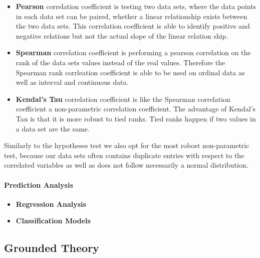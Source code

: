 \begin{itemize}
\item\textbf{Pearson} correlation coefficient is testing two data sets, where the data points in each data set can be paired, whether a linear relationship exists between the two data sets.
This correlation coefficient is able to identify positive and negative relations but not the actual slope of the linear relation ship.

\item\textbf{Spearman} correlation coefficient is performing a pearson correlation on the rank of the data sets values instead of the real values.
Therefore the Spearman rank corrleation coefficient is able to be used on ordinal data as well as interval and continuous data. 

\item\textbf{Kendal's Tau} correlation coefficient is like the Spearman correlation coefficient a non-parametric correlation coefficient.
The advantage of Kendal's Tau is that it is more robust to tied ranks.
Tied ranks happen if two values in a data set are the same.
\end{itemize}

Similarly to the hypotheses test we also opt for the most robost non-parametric test, because our data sets often contains duplicate entries with respect to the correlated variables as well as does not follow necessarily a normal distribution.

\paragraph{Prediction Analysis}
\begin{itemize}
\item\textbf{Regression Analysis}
\item\textbf{Classification Models}
\end{itemize}

\subsection{Grounded Theory}













